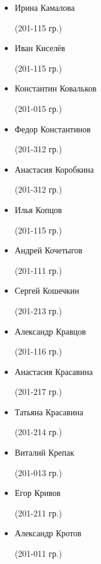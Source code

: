 \begin{multicols}{2}
\begin{small}
\begin{itemize}[leftmargin=0.5em]
	\item[] Ирина Камалова\begin{tiny} (201-115 гр.)\end{tiny}
	\item[] Иван Киселёв\begin{tiny} (201-115 гр.)\end{tiny}
	\item[] Константин Ковальков\begin{tiny} (201-015 гр.)\end{tiny}
	\item[] Федор Константинов\begin{tiny} (201-312 гр.)\end{tiny} %
	\item[] Анастасия Коробкина\begin{tiny} (201-312 гр.)\end{tiny} %
	\item[] Илья Копцов\begin{tiny} (201-115 гр.)\end{tiny} %
	\item[] Андрей Кочетыгов\begin{tiny} (201-111 гр.)\end{tiny} %
	\item[] Сергей Кошечкин\begin{tiny} (201-213 гр.)\end{tiny}
	\item[] Александр Кравцов\begin{tiny} (201-116 гр.)\end{tiny}
	\item[] Анастасия Красавина\begin{tiny} (201-217 гр.)\end{tiny} %
	\item[] Татьяна Красавина\begin{tiny} (201-214 гр.)\end{tiny} %
	\item[] Виталий Крепак\begin{tiny} (201-013 гр.)\end{tiny}
	\item[] Егор Кривов\begin{tiny} (201-211 гр.)\end{tiny}
	\item[] Александр Кротов\begin{tiny} (201-011 гр.)\end{tiny}

\end{itemize}
\end{small}
\end{multicols}
